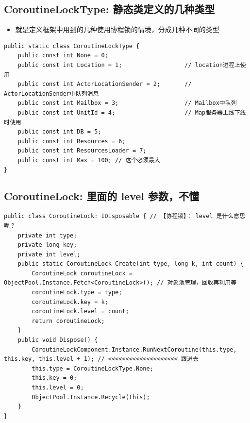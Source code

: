 \documentclass[9pt, b5paper]{article}
\begin{document}
\subsection{CoroutineLockType: 静态类定义的几种类型}
\label{sec-14-1}
\begin{itemize}
\item 就是定义框架中用到的几种使用协程锁的情境，分成几种不同的类型
\end{itemize}
\begin{verbatim}
public static class CoroutineLockType {
    public const int None = 0;
    public const int Location = 1;                  // location进程上使用
    public const int ActorLocationSender = 2;       // ActorLocationSender中队列消息
    public const int Mailbox = 3;                   // Mailbox中队列
    public const int UnitId = 4;                    // Map服务器上线下线时使用
    public const int DB = 5;
    public const int Resources = 6;
    public const int ResourcesLoader = 7;
    public const int Max = 100; // 这个必须最大
}
\end{verbatim}
\subsection{CoroutineLock: 里面的 level 参数，不懂}
\label{sec-14-2}
\begin{verbatim}
public class CoroutineLock: IDisposable { // 【协程锁】： level 是什么意思呢？
    private int type;
    private long key;
    private int level;
    public static CoroutineLock Create(int type, long k, int count) {
        CoroutineLock coroutineLock = ObjectPool.Instance.Fetch<CoroutineLock>(); // 对象池管理，回收再利用等
        coroutineLock.type = type;
        coroutineLock.key = k;
        coroutineLock.level = count;
        return coroutineLock;
    }
    public void Dispose() {
        CoroutineLockComponent.Instance.RunNextCoroutine(this.type, this.key, this.level + 1); // <<<<<<<<<<<<<<<<<<<< 跟进去
        this.type = CoroutineLockType.None;
        this.key = 0;
        this.level = 0;
        ObjectPool.Instance.Recycle(this);
    }
}
\end{verbatim}
\end{document}
